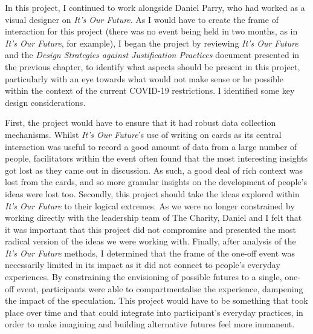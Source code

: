 In this project, I continued to work alongside Daniel Parry, who had worked as a visual designer on \textit{It's Our Future}. As I would have to create the frame of interaction for this project (there was no event being held in two months, as in \emph{It's Our Future}, for example), I began the project by reviewing \emph{It's Our Future} and the \emph{Design Strategies against Justification Practices} document presented in the previous chapter, to identify what aspects should be present in this project, particularly with an eye towards what would not make sense or be possible within the context of the current COVID-19 restrictions.  I identified some key design considerations. 

First, the project would have to ensure that it had robust data collection mechanisms. Whilst \emph{It's Our Future}'s use of writing on cards as its central interaction was useful to record a good amount of data from a large number of people, facilitators within the event often found that the most interesting insights got lost as they came out in discussion. As such, a good deal of rich context was lost from the cards, and so more granular insights on the development of people's ideas were lost too. Secondly, this project should take the ideas explored within \emph{It's Our Future} to their logical extremes. As we were no longer constrained by working directly with the leadership team of The Charity, Daniel and I felt that it was important that this project did not compromise and presented the most radical version of the ideas we were working with. Finally, after analysis of the \emph{It's Our Future} methods, I determined that the frame of the one-off event was necessarily limited in its impact as it did not connect to people's everyday experiences. By constraining the envisioning of possible futures to a single, one-off event, participants were able to compartmentalise the experience, dampening the impact of the speculation. This project would have to be something that took place over time and that could integrate into participant's everyday practices, in order to make imagining and building alternative futures feel more immanent.  

